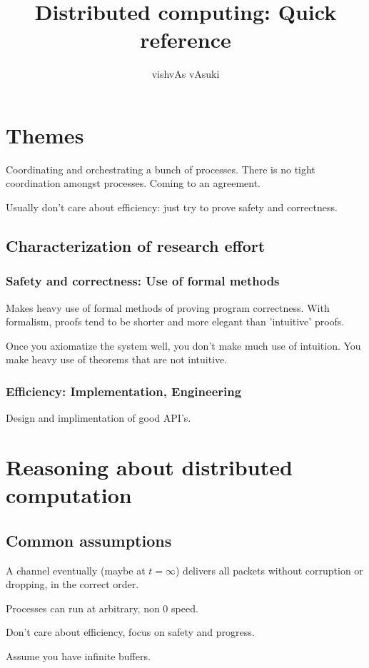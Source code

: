 \documentclass[oneside, article]{memoir}
\title{Distributed computing: Quick reference}
\author{vishvAs vAsuki}
\begin{document}
\maketitle

\tableofcontents

\chapter{Themes}
Coordinating and orchestrating a bunch of processes. There is no tight coordination amongst processes. Coming to an agreement.

Usually don't care about efficiency: just try to prove safety and correctness.

\section{Characterization of research effort}
\subsection{Safety and correctness: Use of formal methods}
Makes heavy use of formal methods of proving program correctness. With formalism, proofs tend to be shorter and more elegant than 'intuitive' proofs.

Once you axiomatize the system well, you don't make much use of intuition. You make heavy use of theorems that are not intuitive.

\subsection{Efficiency: Implementation, Engineering}
Design and implimentation of good API's.

\chapter{Reasoning about distributed computation}
\section{Common assumptions}
A channel eventually (maybe at $t=\infty$) delivers all packets without corruption or dropping, in the correct order.

Processes can run at arbitrary, non 0 speed.

Don't care about efficiency, focus on safety and progress.

Assume you have infinite buffers.
\end{document}
